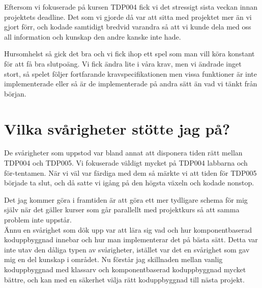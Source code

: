 \documentclass{template}
\begin{document}
Eftersom vi fokuserade på kursen TDP004 fick vi det stressigt sista veckan innan projektets deadline. Det som vi gjorde då var att sitta med projektet mer än vi gjort förr, och kodade samtidigt bredvid varandra så att vi kunde dela med oss all information och kunskap den andre kanske inte hade. 

Hursomhelst så gick det bra och vi fick ihop ett spel som man vill köra konstant för att få bra slutpoäng. Vi fick ändra lite i våra krav, men vi ändrade inget stort, så spelet följer fortfarande kravspecifikationen men vissa funktioner är inte implementerade eller så är de implementerade på andra sätt än vad vi tänkt från början.

\section{Vilka svårigheter stötte jag på?}
De svårigheter som uppstod var bland annat att disponera tiden rätt mellan TDP004 och TDP005. Vi fokuserade väldigt mycket på TDP004 labbarna och för-tentamen. När vi väl var färdiga med dem så märkte vi att tiden för TDP005 började ta slut, och då satte vi igång på den högsta växeln och kodade nonstop.

Det jag kommer göra i framtiden är att göra ett mer tydligare schema för mig själv när det gäller kurser som går parallellt med projektkurs så att samma problem inte uppstår.\\

Ännu en svårighet som dök upp var att lära sig vad och hur komponentbaserad koduppbyggnad innebar och hur man implementerar det på bästa sätt. Detta var inte utav den dåliga typen av svårigheter, istället var det en svårighet som gav mig en del kunskap i området. Nu förstår jag skillnaden mellan vanlig koduppbyggnad med klassarv och komponentbaserad koduppbyggnad mycket bättre, och kan med en säkerhet välja rätt koduppbyggnad till nästa projekt.
\end{document}
